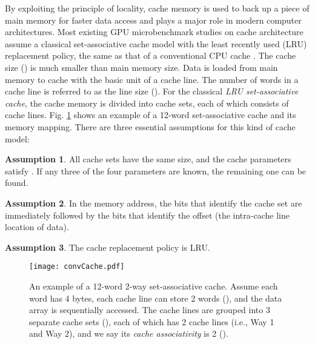 \documentclass[10pt,journal,compsoc]{IEEEtran}
\theoremstyle{definition}
\newtheorem{cor}{Assumption}
\begin{document}
By exploiting the principle of locality, cache memory is used to back up a piece of main memory for faster data access and plays a major role in modern computer architectures. Most existing GPU microbenchmark studies on cache architecture assume a classical set-associative cache model with the least recently used (LRU) replacement policy, the same as that of a conventional CPU cache \cite{saavedra1992cpu, saavedra1995measuring}. The cache size () is much smaller than main memory size. Data is loaded from main memory to cache with the basic unit of a cache line. The number of words in a cache line is referred to as the line size (). For the classical \emph{LRU set-associative cache}, the cache memory is divided into  cache sets, each of which consists of  cache lines. Fig. \ref{fig:covCache} shows an example of a 12-word set-associative cache and its memory mapping. There are three essential assumptions for this kind of cache model:

\begin{cor}
\label{def:cond1}
All cache sets have the same size, and the cache parameters satisfy . If any three of the four parameters are known, the remaining one can be found.
\end{cor}

\begin{cor}
\label{def:cond2}
In the memory address, the bits that identify the cache set are immediately followed by the bits that identify the offset (the intra-cache line location of data).
\end{cor}

\begin{cor}
\label{def:cond3}
The cache replacement policy is LRU.
\end{cor}

\begin{figure}
  \centering
  \texttt{[image: convCache.pdf]}
  \caption{An example of a 12-word 2-way set-associative cache. Assume each word has 4 bytes, each cache line can store 2 words (), and the data array is sequentially accessed. The cache lines are grouped into 3 separate cache sets (), each of which has 2 cache lines (i.e., Way 1 and Way 2), and we say its \emph{cache associativity} is 2 (). }
  \label{fig:covCache}
\end{figure}
\end{document}
